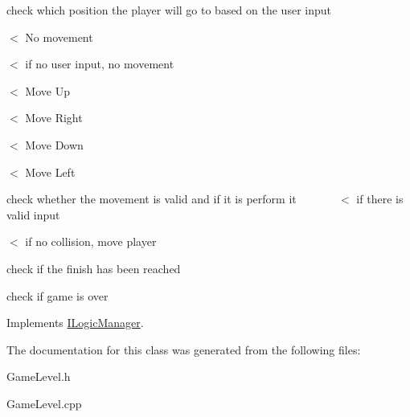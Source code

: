 check which position the player will go to based on the user input

$<$ No movement

$<$ if no user input, no movement

$<$ Move Up

$<$ Move Right

$<$ Move Down

$<$ Move Left

check whether the movement is valid and if it is perform it ~\newline
~\newline
~\newline
~\newline
 $<$ if there is valid input

$<$ if no collision, move player

check if the finish has been reached

check if game is over 

Implements \mbox{\hyperlink{class_i_logic_manager}{I\+Logic\+Manager}}.



The documentation for this class was generated from the following files\+:\begin{DoxyCompactItemize}
\item 
Game\+Level.\+h\item 
Game\+Level.\+cpp\end{DoxyCompactItemize}
